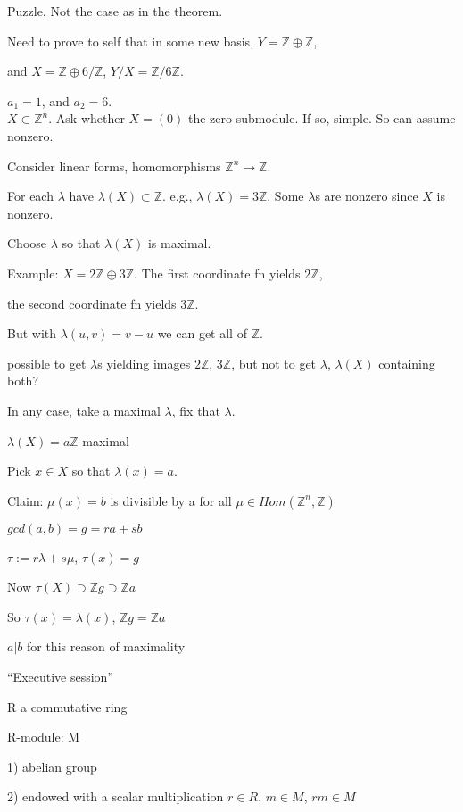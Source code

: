 \documentclass[12pt]{article}
\begin{document}
Puzzle.  Not the case as in the theorem.

Need to prove to self that in some new basis, $Y = \mathds{Z} \oplus \mathds{Z}$, 

and $X = \mathds{Z} \oplus 6/\mathds{Z}$, $Y/X = \mathds{Z}/6\mathds{Z}$.

$a_1 = 1$, and $a_2 = 6$.\\

\noindent
$X \subset \mathds{Z}^n$.  Ask whether $X = (0)$ the zero submodule.  If so, simple.  So can assume nonzero.

Consider linear forms, homomorphisms $\mathds{Z}^n \to \mathds{Z}$.

For each $\lambda$ have $\lambda(X) \subset \mathds{Z}$.  e.g., $\lambda(X) = 3\mathds{Z}$.  Some $\lambda$s are nonzero since $X$ is nonzero.

Choose $\lambda$ so that $\lambda(X)$ is maximal.

Example: $X = 2\mathds{Z} \oplus 3\mathds{Z}$.  The first coordinate fn yields $2\mathds{Z}$, 

the second coordinate fn yields $3\mathds{Z}$.

But with $\lambda(u, v) = v - u$ we can get all of $\mathds{Z}$.

possible to get $\lambda$s yielding images $2\mathds{Z}$, $3\mathds{Z}$, but not to get $\lambda$, $\lambda(X)$ containing both?

In any case, take a maximal $\lambda$, fix that $\lambda$.

$\lambda(X) = a\mathds{Z}$ maximal

Pick $x \in X$ so that $\lambda(x) = a$.

\noindent
Claim: $\mu(x) = b$ is divisible by a for all $\mu \in Hom(\mathds{Z}^n, \mathds{Z})$

$gcd(a, b) = g = ra + sb$

$\tau := r\lambda + s\mu$, $\tau(x) = g$

Now $\tau(X) \supset \mathds{Z}g \supset \mathds{Z}a$

So $\tau(x) = \lambda(x)$, $\mathds{Z}g = \mathds{Z}a$

$a | b$ for this reason of maximality

\noindent
``Executive session''

R a commutative ring

R-module: M

1) abelian group

2) endowed with a scalar multiplication $r \in R$, $m \in M$, $rm \in M$
\end{document}
